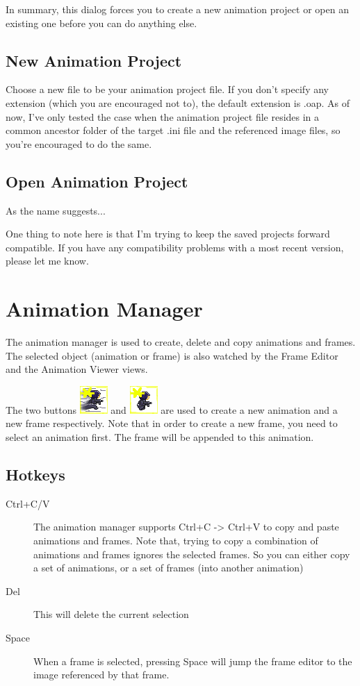\documentclass{article}
\begin{document}
In summary, this dialog forces you to create a new animation project or open an existing one before you can do anything else.

\subsection{New Animation Project}
Choose a new file to be your animation project file. If you don't specify any extension (which you are encouraged not to), the default extension is .oap. As of now, I've
only tested the case when the animation project file resides in a common ancestor folder of the target .ini file and the referenced image files, so you're encouraged to
do the same.

\subsection{Open Animation Project}
As the name suggests... 

One thing to note here is that I'm trying to keep the saved projects forward compatible. If you have any compatibility problems with a most recent version, please let me know.

\section{Animation Manager}
\label{sec:AnimationManager}
The animation manager is used to create, delete and copy animations and frames. The selected object (animation or frame) is also watched by the Frame Editor and the
Animation Viewer views.

The two buttons \includegraphics{icons/NewAnimation} and \includegraphics{icons/NewFrame} are used to create a new animation and a new frame respectively. Note that
in order to create a new frame, you need to select an animation first. The frame will be appended to this animation.

\subsection{Hotkeys}
\begin{description}
\item[Ctrl+C/V] The animation manager supports Ctrl+C -> Ctrl+V to copy and paste animations and frames. Note that, trying to copy a combination of animations and frames ignores the selected frames. So you can either copy a set of animations, or a set of frames (into another animation)
\item[Del]   This will delete the current selection
\item[Space] When a frame is selected, pressing Space will jump the frame editor to the image referenced by that frame.

\end{description}
\end{document}
